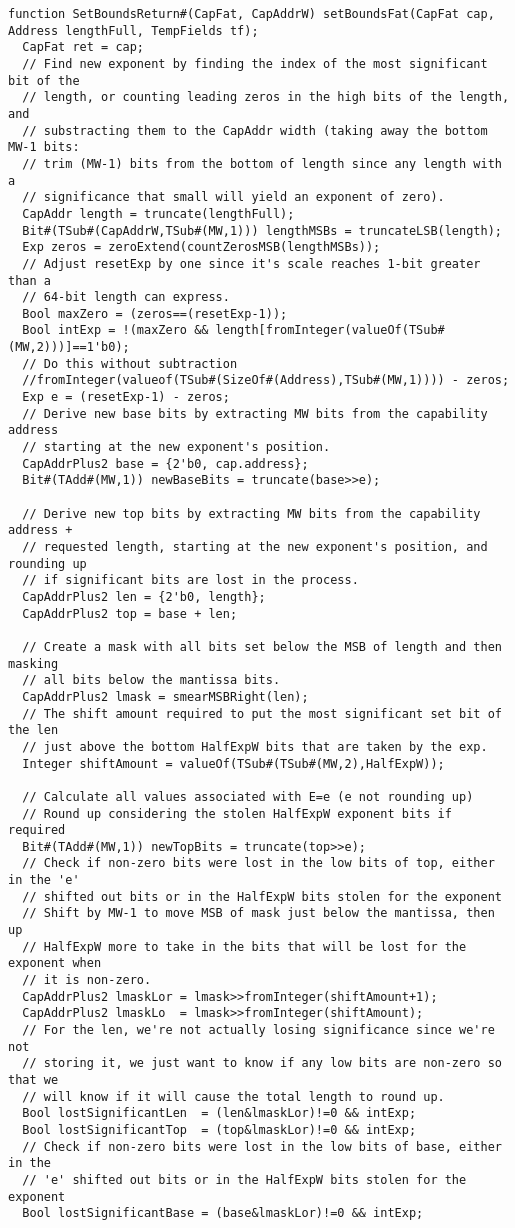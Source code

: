 \begin{lstlisting}[language=bluespec]
function SetBoundsReturn#(CapFat, CapAddrW) setBoundsFat(CapFat cap, Address lengthFull, TempFields tf);
  CapFat ret = cap;
  // Find new exponent by finding the index of the most significant bit of the
  // length, or counting leading zeros in the high bits of the length, and
  // substracting them to the CapAddr width (taking away the bottom MW-1 bits:
  // trim (MW-1) bits from the bottom of length since any length with a
  // significance that small will yield an exponent of zero).
  CapAddr length = truncate(lengthFull);
  Bit#(TSub#(CapAddrW,TSub#(MW,1))) lengthMSBs = truncateLSB(length);
  Exp zeros = zeroExtend(countZerosMSB(lengthMSBs));
  // Adjust resetExp by one since it's scale reaches 1-bit greater than a
  // 64-bit length can express.
  Bool maxZero = (zeros==(resetExp-1));
  Bool intExp = !(maxZero && length[fromInteger(valueOf(TSub#(MW,2)))]==1'b0);
  // Do this without subtraction
  //fromInteger(valueof(TSub#(SizeOf#(Address),TSub#(MW,1)))) - zeros;
  Exp e = (resetExp-1) - zeros;
  // Derive new base bits by extracting MW bits from the capability address
  // starting at the new exponent's position.
  CapAddrPlus2 base = {2'b0, cap.address};
  Bit#(TAdd#(MW,1)) newBaseBits = truncate(base>>e);

  // Derive new top bits by extracting MW bits from the capability address +
  // requested length, starting at the new exponent's position, and rounding up
  // if significant bits are lost in the process.
  CapAddrPlus2 len = {2'b0, length};
  CapAddrPlus2 top = base + len;

  // Create a mask with all bits set below the MSB of length and then masking
  // all bits below the mantissa bits.
  CapAddrPlus2 lmask = smearMSBRight(len);
  // The shift amount required to put the most significant set bit of the len
  // just above the bottom HalfExpW bits that are taken by the exp.
  Integer shiftAmount = valueOf(TSub#(TSub#(MW,2),HalfExpW));

  // Calculate all values associated with E=e (e not rounding up)
  // Round up considering the stolen HalfExpW exponent bits if required
  Bit#(TAdd#(MW,1)) newTopBits = truncate(top>>e);
  // Check if non-zero bits were lost in the low bits of top, either in the 'e'
  // shifted out bits or in the HalfExpW bits stolen for the exponent
  // Shift by MW-1 to move MSB of mask just below the mantissa, then up
  // HalfExpW more to take in the bits that will be lost for the exponent when
  // it is non-zero.
  CapAddrPlus2 lmaskLor = lmask>>fromInteger(shiftAmount+1);
  CapAddrPlus2 lmaskLo  = lmask>>fromInteger(shiftAmount);
  // For the len, we're not actually losing significance since we're not
  // storing it, we just want to know if any low bits are non-zero so that we
  // will know if it will cause the total length to round up.
  Bool lostSignificantLen  = (len&lmaskLor)!=0 && intExp;
  Bool lostSignificantTop  = (top&lmaskLor)!=0 && intExp;
  // Check if non-zero bits were lost in the low bits of base, either in the
  // 'e' shifted out bits or in the HalfExpW bits stolen for the exponent
  Bool lostSignificantBase = (base&lmaskLor)!=0 && intExp;


\end{lstlisting}

